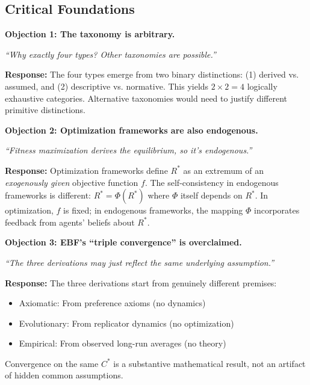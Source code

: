 
\subsection{Critical Foundations}
\label{sec:AY-foundations}

\begin{tcolorbox}[colback=red!5!white, colframe=red!75!black,
    title=\textbf{Critical Foundations: Objections and Responses}]

\textbf{Objection 1: The taxonomy is arbitrary.}

\textit{``Why exactly four types? Other taxonomies are possible.''}

\textbf{Response:} The four types emerge from two binary distinctions:
(1) derived vs. assumed, and (2) descriptive vs. normative. This yields
$2 \times 2 = 4$ logically exhaustive categories. Alternative taxonomies
would need to justify different primitive distinctions.

\medskip

\textbf{Objection 2: Optimization frameworks are also endogenous.}

\textit{``Fitness maximization derives the equilibrium, so it's endogenous.''}

\textbf{Response:} Optimization frameworks define $R^*$ as an extremum of an
\emph{exogenously given} objective function $f$. The self-consistency in
endogenous frameworks is different: $R^* = \Phi(R^*)$ where $\Phi$ itself
depends on $R^*$. In optimization, $f$ is fixed; in endogenous frameworks,
the mapping $\Phi$ incorporates feedback from agents' beliefs about $R^*$.

\medskip

\textbf{Objection 3: EBF's ``triple convergence'' is overclaimed.}

\textit{``The three derivations may just reflect the same underlying assumption.''}

\textbf{Response:} The three derivations start from genuinely different premises:
\begin{itemize}[nosep]
    \item Axiomatic: From preference axioms (no dynamics)
    \item Evolutionary: From replicator dynamics (no optimization)
    \item Empirical: From observed long-run averages (no theory)
\end{itemize}
Convergence on the same $C^*$ is a substantive mathematical result, not an
artifact of hidden common assumptions.


\end{tcolorbox}
